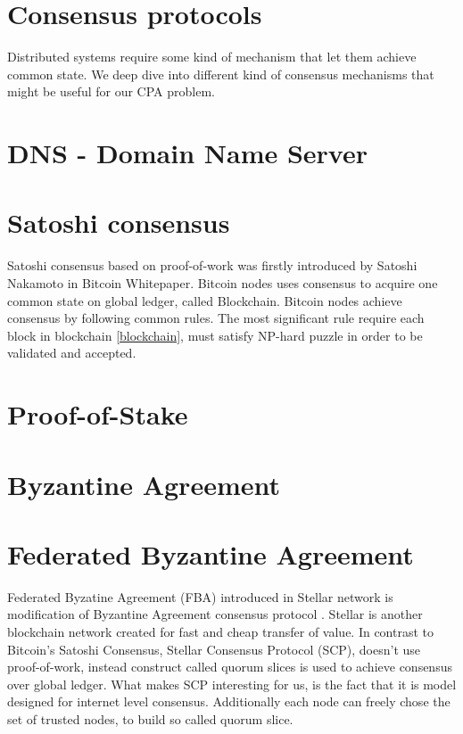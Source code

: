 \documentclass[nostrict]{szablonPG}
\begin{document}

\section{Consensus protocols}
Distributed systems require some kind of mechanism that let them achieve common state. We deep dive into different kind of consensus mechanisms that might be useful for our CPA problem.

\section{DNS - Domain Name Server}

\section{Satoshi consensus}
Satoshi consensus based on proof-of-work was firstly introduced by Satoshi Nakamoto in Bitcoin Whitepaper.
Bitcoin nodes uses consensus to acquire one common state on global ledger, called Blockchain. Bitcoin nodes achieve consensus by following common rules. The most significant rule require each block in blockchain \ref{blockchain}, must satisfy NP-hard puzzle in order to be validated and accepted. 

\section{Proof-of-Stake}


\section{Byzantine Agreement}


\section{Federated Byzantine Agreement}
Federated Byzatine Agreement (FBA) introduced in Stellar network is modification of Byzantine Agreement consensus protocol \cite{mazieres2015stellar}. Stellar is another blockchain network created for fast and cheap transfer of value. In contrast to Bitcoin's Satoshi Consensus, Stellar Consensus Protocol (SCP), doesn't use proof-of-work, instead construct called quorum slices is used to achieve consensus over global ledger. What makes SCP interesting for us, is the fact that it is model designed for internet level consensus. Additionally each node can freely chose the set of trusted nodes, to build so called quorum slice.
\end{document}
